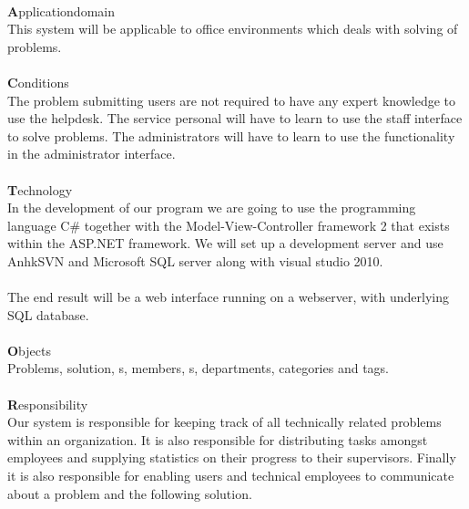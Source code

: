 \ \\
{\Large \textbf{A}}pplicationdomain \\
This system will be applicable to office environments which deals with solving of problems.\\
\ \\
{\Large \textbf{C}}onditions \\ 
The problem submitting users are not required to have any expert knowledge to use the helpdesk. The service personal will have to learn to use the staff interface to solve problems. The administrators will have to learn to use the functionality in the administrator interface.   \\
\ \\
{\Large \textbf{T}}echnology \\
In the development of our program we are going to use the programming language C\# together with the Model-View-Controller framework 2 that exists within the ASP.NET framework. We will set up a development server and use AnhkSVN and Microsoft SQL server along with visual studio 2010.\\
\\
The end result will be a web interface running on a webserver, with underlying SQL database.\\
\ \\
{\Large \textbf{O}}bjects \\
Problems, solution, \aclient s, \astaff members, \admin s, departments, categories and tags. \\
\ \\
{\Large \textbf{R}}esponsibility \\
Our system is responsible for keeping track of all technically related problems within an organization. It is also responsible for distributing tasks amongst employees and supplying statistics on their progress to their supervisors. Finally it is also responsible for enabling users and technical employees to communicate about a problem and the following solution.
\ \\ 

